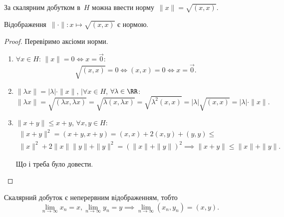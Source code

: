 За скалярним добутком в~$H$ можна ввести норму~$\|x\| = \sqrt{(x, x)}$.

\begin{lemma}
Відображення~$\|\cdot\|: x \mapsto \sqrt{(x, x)}$ є нормою.
\end{lemma}

\begin{proof}
Перевіримо аксіоми норми.
\begin{enumerate}
\item $\forall x \in H$: $\|x\| = 0 \iff x = \vec 0$:
\begin{equation*}
    \sqrt{(x, x)} = 0 \iff (x, x) = 0 \iff x = \vec 0.
\end{equation*}

\item $\|\lambda x\| = |\lambda| \cdot \|x\|$, $|\forall x \in H$, $\forall \lambda \in \RR$:
\begin{equation*}
    \|\lambda x\| =
    \sqrt{(\lambda x, \lambda x)} =
    \sqrt{\lambda (x, \lambda x)} =
    \sqrt{\lambda^2 (x, x)} =
    |\lambda| \sqrt{(x, x)} =
    |\lambda| \cdot \|x\|.
\end{equation*}

\item $\|x + y\| \le x + y$, $\forall x, y \in H$:
\begin{multline*}
    \|x + y\|^2 = (x + y, x + y) =
    (x, x) + 2 (x, y) + (y, y) \le \\
    \|x\|^2 + 2 \|x\| \|y\| + \|y\|^2 =
    (\|x\| + \|y\|)^2 \implies
    \|x + y\| \le \|x\| + \|y\|.
\end{multline*}

Що і треба було довести. \qedhere
\end{enumerate}
\end{proof}

\begin{lemma}
Скалярний добуток є неперервним
відображенням, тобто
\begin{equation*}
    \lim_{n \to \infty} x_n = x,
    \lim_{n \to \infty} y_n = y \implies
    \lim_{n \to \infty} (x_n, y_n) = (x, y).
\end{equation*}
\end{lemma}

